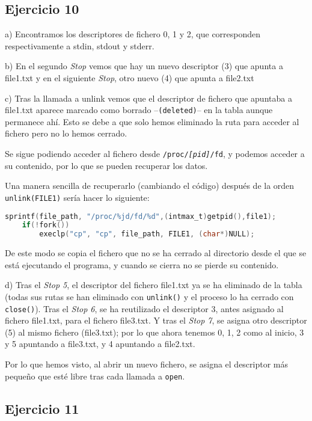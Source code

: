 \documentclass{article}
\begin{document}
\subsection*{Ejercicio 10}

a) Encontramos los descriptores de fichero 0, 1 y 2, que corresponden respectivamente a stdin, stdout y stderr.

b) En el segundo \textit{Stop} vemos que hay un nuevo descriptor (3) que apunta a file1.txt y en el siguiente \textit{Stop}, otro nuevo (4) que apunta a file2.txt

c) Tras la llamada a unlink vemos que el descriptor de fichero que apuntaba a file1.txt aparece marcado como borrado --\texttt{(deleted)}-- en la tabla aunque permanece ahí. Esto se debe a que solo hemos eliminado la ruta para acceder al fichero pero no lo hemos cerrado.

Se sigue podiendo acceder al fichero desde \texttt{/proc/\textit{[pid]}/fd}, y podemos acceder a su contenido, por lo que se pueden recuperar los datos.

Una manera sencilla de recuperarlo (cambiando el código) después de la orden \texttt{unlink(FILE1)} sería hacer lo siguiente:
\begin{lstlisting}[language=C]
    sprintf(file_path, "/proc/%jd/fd/%d",(intmax_t)getpid(),file1);
    if(!fork())
        execlp("cp", "cp", file_path, FILE1, (char*)NULL);
\end{lstlisting}

De este modo se copia el fichero que no se ha cerrado al directorio desde el que se está ejecutando el programa, y cuando se cierra no se pierde su contenido.


d) Tras el \textit{Stop 5}, el descriptor del fichero file1.txt ya se ha eliminado de la tabla (todas sus rutas se han eliminado con \texttt{unlink()} y el proceso lo ha cerrado con \texttt{close()}). Tras el \textit{Stop 6}, se ha reutilizado el descriptor 3, antes asignado al fichero file1.txt, para el fichero file3.txt. Y tras el \textit{Stop 7}, se asigna otro descriptor (5) al mismo fichero (file3.txt); por lo que ahora tenemos 0, 1, 2 como al inicio, 3 y 5 apuntando a file3.txt, y 4 apuntando a file2.txt.

Por lo que hemos visto, al abrir un nuevo fichero, se asigna el descriptor más pequeño que esté libre tras cada llamada a \texttt{open}.

\subsection*{Ejercicio 11}
\end{document}
